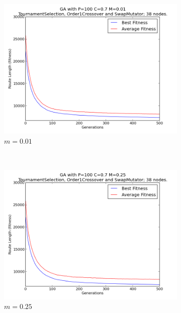 \documentclass[10pt, a4paper]{article}
\begin{document}
\begin{figure}[h]
\centering

\begin{subfigure}[b]{0.67\textwidth}
\includegraphics[width=\textwidth]{img/results/order1crossover/swapmutator/n38p100c07m001}
\caption{$m = 0.01$}
\end{subfigure}
~
\begin{subfigure}[b]{0.67\textwidth}
\includegraphics[width=\textwidth]{img/results/order1crossover/swapmutator/n38p100c07m025}
\caption{$m = 0.25$}
\end{subfigure}
~
\begin{subfigure}[b]{0.67\textwidth}

\end{subfigure}
\end{figure}
\end{document}
